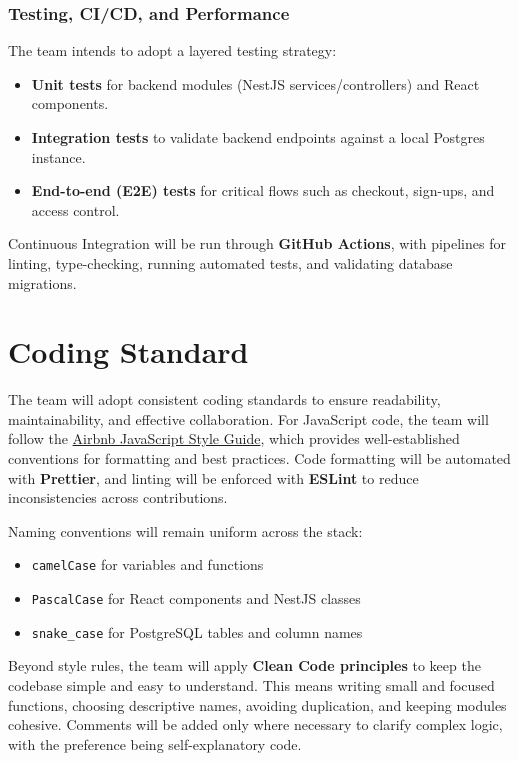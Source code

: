 \documentclass{article}
\begin{document}
\subsubsection*{Testing, CI/CD, and Performance} 
The team intends to adopt a layered testing strategy:
\begin{itemize}
  \item \textbf{Unit tests} for backend modules (NestJS services/controllers) and React components.
  \item \textbf{Integration tests} to validate backend endpoints against a local Postgres instance.
  \item \textbf{End-to-end (E2E) tests} for critical flows such as checkout, sign-ups, and access control.
\end{itemize}
Continuous Integration will be run through \textbf{GitHub Actions}, with pipelines for linting, type-checking, running automated tests, and validating database migrations.

\section{Coding Standard}

The team will adopt consistent coding standards to ensure readability, maintainability, and effective collaboration. For JavaScript code, the team will follow the \href{https://github.com/airbnb/javascript}{Airbnb JavaScript Style Guide}, which provides well-established conventions for formatting and best practices. Code formatting will be automated with \textbf{Prettier}, and linting will be enforced with \textbf{ESLint} to reduce inconsistencies across contributions.

Naming conventions will remain uniform across the stack:
\begin{itemize}
  \item \texttt{camelCase} for variables and functions
  \item \texttt{PascalCase} for React components and NestJS classes
  \item \texttt{snake\_case} for PostgreSQL tables and column names
\end{itemize}

Beyond style rules, the team will apply \textbf{Clean Code principles} to keep the codebase simple and easy to understand. This means writing small and focused functions, choosing descriptive names, avoiding duplication, and keeping modules cohesive. Comments will be added only where necessary to clarify complex logic, with the preference being self-explanatory code.
\end{document}

